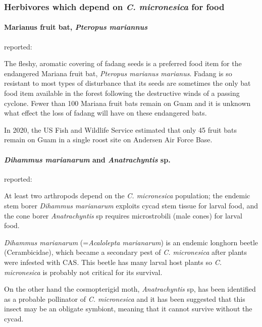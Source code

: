 \documentclass[12pt,letterpaper,english,bibliography=totocnumbered, abstract=on]{scrartcl}
\begin{document}
\subsubsection{Herbivores which depend on \textit{C. micronesica} for food} 

\paragraph{Marianus fruit bat, \textit{Pteropus mariannus}}

\cite{haynesExoticInvasivePest2005} reported:
\begin{displayquote}
The fleshy, aromatic covering of fadang seeds is a preferred food item for the endangered Mariana
fruit bat, \textit{Pteropus marianus marianus}. Fadang is so resistant to most types of disturbance that its
seeds are sometimes the only bat food item available in the forest following the destructive winds of a
passing cyclone. Fewer than 100 Mariana fruit bats remain on Guam and it is unknown what effect the
loss of fadang will have on these endangered bats.
\end{displayquote}

In 2020, the US Fish and Wildlife Service estimated that only 45 fruit bats remain on Guam in a single roost site on Andersen Air Force Base.

\paragraph{\textit{Dihammus marianarum} and \textit{Anatrachyntis} sp.}

\cite{marlerCanopyKnowledgeGaps2013} reported:
\begin{displayquote}
At least two arthropods	depend on the \textit{C. micronesica} population;
the endemic stem borer \textit{Dihammus marianarum} exploits cycad stem tissue for larval food, and the cone borer \textit{Anatrachyntis} sp requires microstrobili (male cones) for larval food.
\end{displayquote}

\textit{Dihammus marianarum} (=\textit{Acalolepta marianarum}) is an endemic longhorn beetle (Cerambicidae), which became a secondary pest of \textit{C. micronesica} after plants were infested with CAS. This beetle has many larval host plants \parencite{marlerPestsCycasMicronesica2006} so \textit{C. micronesica} is probably not critical for its survival.

On the other hand the cosmopterigid moth, \textit{Anatrachyntis} sp, has been identified as a probable pollinator of \textit{C. micronesica} and it has been suggested that this insect may be an obligate symbiont, meaning that it cannot survive without the cycad. 
\end{document}

